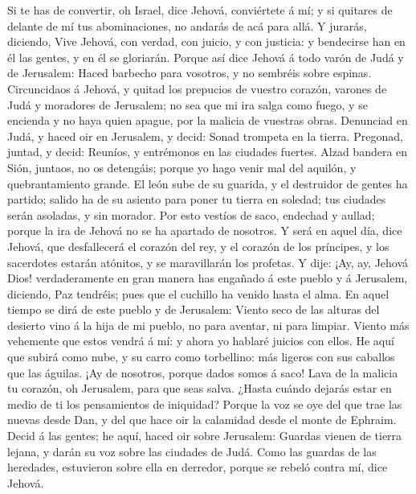  Si te has de convertir, oh Israel, dice Jehová,
conviértete á mí; y si quitares de delante de mí tus abominaciones, no
andarás de acá para allá.  Y jurarás, diciendo, Vive
Jehová, con verdad, con juicio, y con justicia: y bendecirse han en él
las gentes, y en él se gloriarán.  Porque así dice Jehová
á todo varón de Judá y de Jerusalem: Haced barbecho para vosotros, y no
sembréis sobre espinas.  Circuncidaos á Jehová, y quitad
los prepucios de vuestro corazón, varones de Judá y moradores de
Jerusalem; no sea que mi ira salga como fuego, y se encienda y no haya
quien apague, por la malicia de vuestras obras.  Denunciad
en Judá, y haced oir en Jerusalem, y decid: Sonad trompeta en la tierra.
Pregonad, juntad, y decid: Reuníos, y entrémonos en las ciudades
fuertes.  Alzad bandera en Sión, juntaos, no os detengáis;
porque yo hago venir mal del aquilón, y quebrantamiento grande.
 El león sube de su guarida, y el destruidor de gentes ha
partido; salido ha de su asiento para poner tu tierra en soledad; tus
ciudades serán asoladas, y sin morador.  Por esto vestíos
de saco, endechad y aullad; porque la ira de Jehová no se ha apartado de
nosotros.  Y será en aquel día, dice Jehová, que
desfallecerá el corazón del rey, y el corazón de los príncipes, y los
sacerdotes estarán atónitos, y se maravillarán los profetas.
 Y dije: ¡Ay, ay, Jehová Dios! verdaderamente en gran
manera has engañado á este pueblo y á Jerusalem, diciendo, Paz tendréis;
pues que el cuchillo ha venido hasta el alma.  En aquel
tiempo se dirá de este pueblo y de Jerusalem: Viento seco de las alturas
del desierto vino á la hija de mi pueblo, no para aventar, ni para
limpiar.  Viento más vehemente que estos vendrá á mí: y
ahora yo hablaré juicios con ellos.  He aquí que subirá
como nube, y su carro como torbellino: más ligeros con sus caballos que
las águilas. ¡Ay de nosotros, porque dados somos á saco! 
Lava de la malicia tu corazón, oh Jerusalem, para que seas salva. ¿Hasta
cuándo dejarás estar en medio de ti los pensamientos de iniquidad?
 Porque la voz se oye del que trae las nuevas desde Dan,
y del que hace oir la calamidad desde el monte de Ephraim.
 Decid á las gentes; he aquí, haced oir sobre Jerusalem:
Guardas vienen de tierra lejana, y darán su voz sobre las ciudades de
Judá.  Como las guardas de las heredades, estuvieron
sobre ella en derredor, porque se rebeló contra mí, dice Jehová.
